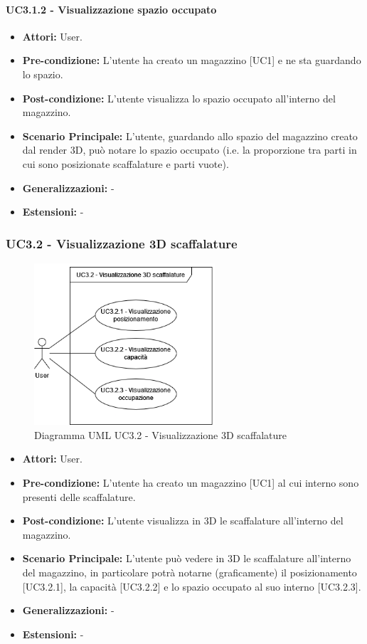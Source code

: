 \paragraph{UC3.1.2 - Visualizzazione spazio occupato}
\begin{itemize}
    \item \textbf{Attori:} User.
    \item \textbf{Pre-condizione:} L'utente ha creato un magazzino [UC1] e ne sta guardando lo spazio.
    \item \textbf{Post-condizione:} L'utente visualizza lo spazio occupato all'interno del magazzino.
    \item \textbf{Scenario Principale:}  L'utente, guardando allo spazio del magazzino creato dal render 3D, può notare lo spazio occupato (i.e. la proporzione tra parti in cui sono posizionate scaffalature e parti vuote).
    \item \textbf{Generalizzazioni:} -
    \item \textbf{Estensioni:} -
\end{itemize}


\subsubsection{UC3.2 - Visualizzazione 3D scaffalature}
\begin{figure}[H]
  \centering
  \includegraphics[width=0.6\textwidth]{UC_diagrams_1-10/UC3.2.drawio.png}
   \caption{Diagramma UML UC3.2 - Visualizzazione 3D scaffalature}
\end{figure}
\begin{itemize}
    \item \textbf{Attori:} User.
    \item \textbf{Pre-condizione:} L'utente ha creato un magazzino [UC1] al cui interno sono presenti delle scaffalature.
    \item \textbf{Post-condizione:} L'utente visualizza in 3D le scaffalature all'interno del magazzino.
    \item \textbf{Scenario Principale:}  L'utente può vedere in 3D le scaffalature all'interno del magazzino, in particolare potrà notarne (graficamente) il posizionamento [UC3.2.1], la capacità [UC3.2.2] e lo spazio occupato al suo interno [UC3.2.3].
    \item \textbf{Generalizzazioni:} -
    \item \textbf{Estensioni:} -
\end{itemize}


